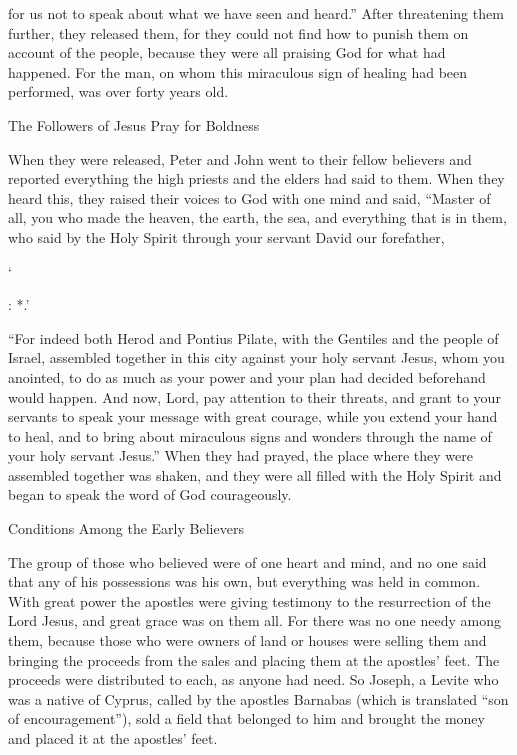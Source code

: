 {for us
not
to speak
about what
we have seen
and
heard.”
After threatening
them further,
they released
them,
for they could
not
find
how
to punish
them
on account of
the people,
because
they were
all
praising
God
for
what had happened.
For
the man,
on
whom
this
miraculous sign
of healing
had been performed,
was
over
forty
years old.
\par }{\SH The Followers of Jesus Pray for Boldness
\par }{\PP {}When
they were released,
Peter and John went
to
their fellow believers
and
reported
everything
the high priests
and
the elders
had said
to
them.
When
they heard
this, they raised
their voices
to
God
with one
mind and
said,
“Master
of all, you
who made
the heaven,
the earth,
the sea,
and
everything
that is in
them,
who said
by the Holy
Spirit
through
your
servant
David
our
forefather,
\par }{\Q ‘{}
\par }{
\par }{\Q {}
\par }{
\par }{: *.’
\par }{\PP {}“For
indeed
both
Herod
and
Pontius
Pilate,
with
the Gentiles
and
the people
of Israel,
assembled together
in
this
city
against
your
holy
servant
Jesus,
whom
you anointed,
to do
as much as
your
power
and
your plan
had decided beforehand
would happen.
And
now,
Lord,
pay attention
to
their
threats,
and
grant
to your
servants
to speak
your
message
with
great
courage,
while you extend
your
hand
to
heal,
and
to bring about miraculous signs
and
wonders
through
the name
of your
holy
servant
Jesus.”
When
they
had prayed,
the place
where
they were
assembled together
was shaken,
and
they were
all
filled
with the Holy
Spirit
and
began to speak
the word
of God
courageously.
\par }{\SH Conditions Among the Early Believers
\par }{\PP {}The group
of those who believed
were
of one
heart
and
mind,
and
no
one
said
that any of his possessions
was
his own,
but
everything
was
held in common.
With
great
power
the apostles
were giving
testimony
to the resurrection
of the Lord
Jesus,
and
great
grace
was
on
them
all.
For
there was
no one
needy
among
them,
because
those who were
owners
of land
or
houses
were selling
them and bringing
the proceeds
from the sales
and
placing
them at
the apostles’
feet.
The proceeds were distributed
to each,
as anyone
had
need.
So
Joseph,
a Levite
who was a native
of Cyprus,
called
by
the apostles
Barnabas
(which
is
translated
“son
of encouragement”),
sold
a field
that belonged
to him
and brought
the money
and
placed
it at
the apostles’
feet.

}
